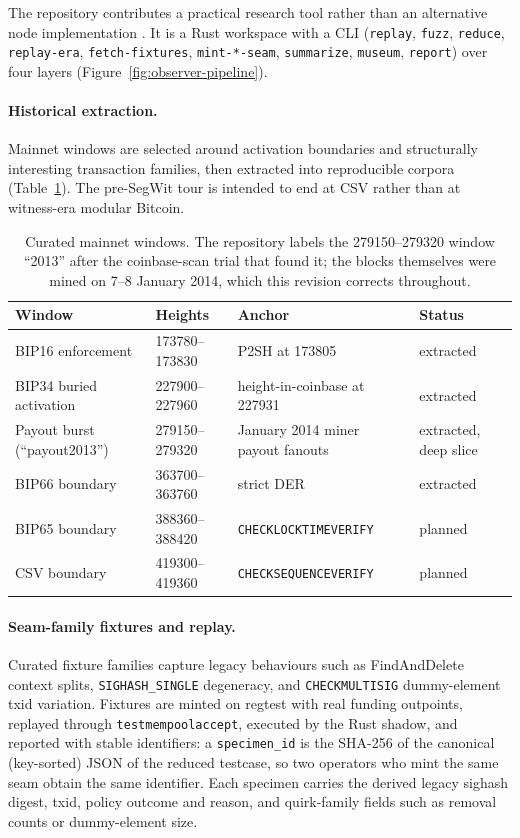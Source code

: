 \documentclass[11pt]{article}
\begin{document}
The repository contributes a practical research tool rather than an alternative
node implementation \cite{dugan2026jurassic}. It is a Rust workspace with a CLI
(\texttt{replay}, \texttt{fuzz}, \texttt{reduce}, \texttt{replay-era},
\texttt{fetch-fixtures}, \texttt{mint-*-seam}, \texttt{summarize},
\texttt{museum}, \texttt{report}) over four layers
(Figure~\ref{fig:observer-pipeline}).

\paragraph{Historical extraction.}
Mainnet windows are selected around activation boundaries and structurally
interesting transaction families, then extracted into reproducible corpora
(Table~\ref{tab:windows}). The pre-SegWit tour is intended to end at CSV rather
than at witness-era modular Bitcoin.

\begin{table}[t]
\centering
\small
\begin{tabular}{llll}
\toprule
Window & Heights & Anchor & Status \\
\midrule
BIP16 enforcement & 173780--173830 & P2SH at 173805 \cite{bip16} & extracted \\
BIP34 buried activation & 227900--227960 & height-in-coinbase at 227931 \cite{bip34} & extracted \\
Payout burst (``payout2013'') & 279150--279320 & January 2014 miner payout fanouts & extracted, deep slice \\
BIP66 boundary & 363700--363760 & strict DER \cite{bip66} & extracted \\
BIP65 boundary & 388360--388420 & \texttt{CHECKLOCKTIMEVERIFY} & planned \\
CSV boundary & 419300--419360 & \texttt{CHECKSEQUENCEVERIFY} & planned \\
\bottomrule
\end{tabular}
\caption{Curated mainnet windows. The repository labels the 279150--279320 window
``2013'' after the coinbase-scan trial that found it; the blocks themselves
were mined on 7--8 January 2014, which this revision corrects throughout.}
\label{tab:windows}
\end{table}

\paragraph{Seam-family fixtures and replay.}
Curated fixture families capture legacy behaviours such as FindAndDelete
context splits, \texttt{SIGHASH\_SINGLE} degeneracy, and \texttt{CHECKMULTISIG}
dummy-element txid variation. Fixtures are minted on regtest with real funding
outpoints, replayed through \texttt{testmempoolaccept}, executed by the Rust
shadow, and reported with stable identifiers: a \texttt{specimen\_id} is the
SHA-256 of the canonical (key-sorted) JSON of the reduced testcase, so two
operators who mint the same seam obtain the same identifier. Each specimen
carries the derived legacy sighash digest, txid, policy outcome and reason, and
quirk-family fields such as removal counts or dummy-element size.
\end{document}
